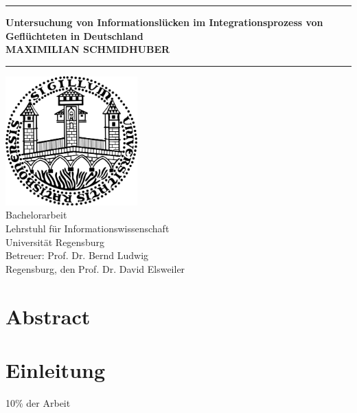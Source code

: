 \documentclass[12pt,oneside]{article}
\newcommand{\JMUTitle}[9]{

  \thispagestyle{empty}
  \vspace*{\stretch{1}}
  {\parindent0cm
  \rule{\linewidth}{.7ex}}
  \begin{flushright}
    \vspace*{\stretch{1}}
    \sffamily\bfseries\Huge
    #1\\
    \vspace*{\stretch{1}}
    \sffamily\bfseries\large
    #2
    \vspace*{\stretch{1}}
  \end{flushright}
  \rule{\linewidth}{.7ex}

  \vspace*{\stretch{1}}
  \begin{center}
    \includegraphics[width=2in]{Unisiegel.png} \\
    \vspace*{\stretch{1}}
    \Large Bachelorarbeit  \\

    \vspace*{\stretch{2}}
   \large Lehrstuhl f\"{u}r Informationswissenschaft\\
    \large Universität Regensburg\\
    \vspace*{\stretch{1}}
    \large Betreuer:  #7 \\[1mm]
    
    \vspace*{\stretch{1}}
    \large Regensburg, den #6
  \end{center}
}
\begin{document}
  \JMUTitle
      {Untersuchung von Informationslücken im Integrationsprozess von Geflüchteten in Deutschland}        %
      {MAXIMILIAN SCHMIDHUBER}                  %
      
      {Fakultät für Sprach-, Literatur- und Kulturwissenschaften}  %
      {Regensburg 2019}                          %
      {24.05.2019}                              %
      {Prof. Dr. David Elsweiler}               %
      {Prof. Dr. Bernd Ludwig}                  %
      
  \clearpage

\lhead{}
    \setcounter{page}{1}

\tableofcontents
\clearpage

\listoffigures

\listoftables
\clearpage

\section*{Abstract}

\blindtext


\cleardoublepage
{}  
    \setcounter{page}{1}
\lhead{\nouppercase{\leftmark}}


\section{Einleitung} \label{einleitung}

10\% der Arbeit

\end{document}
